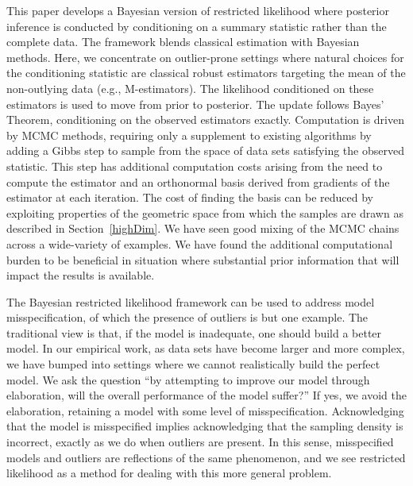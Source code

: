 \documentclass[ba]{imsart}
\newcommand{\response}[1]{{\color{blue}#1}}
\begin{document}
This paper develops a Bayesian version of restricted likelihood where posterior inference is conducted by conditioning on a summary statistic rather than the complete data.  The framework blends classical estimation with Bayesian methods.  
Here, we concentrate on outlier-prone settings where natural choices for the conditioning statistic are classical robust estimators targeting the mean of the non-outlying data (e.g., M-estimators).  The likelihood conditioned on these estimators is used to move from prior to posterior. The update follows Bayes' Theorem, conditioning on the observed estimators exactly.   Computation is driven by MCMC methods, requiring only a supplement to existing algorithms by adding a Gibbs step to sample from the space of data sets satisfying the observed statistic. This step has additional computation costs arising from the need to compute the estimator and an orthonormal basis derived from gradients of the estimator at each iteration. The cost of finding the basis can be reduced by exploiting properties of the geometric space from which the samples are drawn as described in Section~\ref{highDim}. We have seen good mixing of the MCMC chains across a wide-variety of examples. \response{We have found the additional computational burden to be beneficial in situation where  substantial prior information that will impact the results is available.}
 
 
The Bayesian restricted likelihood framework can be used to address model misspecification, of which the presence of outliers is but one example. The traditional view is that, if the model is inadequate, one should build a better model. In our empirical work, as data sets have become larger and more complex, we have bumped into settings where we cannot realistically build the perfect model. We ask the question ``by attempting to improve our model through elaboration, will the overall performance of the model suffer?'' If yes, we avoid the elaboration, retaining a model with some level of misspecification. Acknowledging that the model is misspecified implies acknowledging that the sampling density is incorrect, exactly as we do when outliers are present. In this sense, misspecified models and outliers are reflections of the same phenomenon, and we see restricted likelihood as a method for dealing with this more general problem. 
\end{document}
